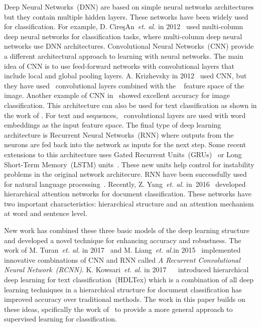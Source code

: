 \documentclass[sigconf, final]{acmart}
\begin{document}
Deep Neural Networks~(DNN) are based on simple neural networks architectures but they contain multiple hidden layers. These networks have been widely used for classification. For example, D. Cire{\c{s}}An~\textit{et. al.} in 2012~\cite{ci2012multitraffic} used multi-column deep neural networks for classification tasks, where  multi-column deep neural networks use DNN architectures. Convolutional Neural Networks~(CNN) provide a different architectural approach to learning with neural networks. The main idea of CNN is to use feed-forward networks with convolutional layers that include local and global pooling layers. A. Krizhevsky in 2012~\cite{krizhevsky2012imagenet} used CNN, but they have used~ convolutional layers combined with the ~ feature space of the image. Another example of CNN in~\cite{lecun2015deep} showed excellent accuracy for image classification.  This architecture can also be used for text classification as shown in the work of \cite{kim2014convolutional}. For text and sequences,~ convolutional layers are used with word embeddings as the input feature space. The final type of deep learning architecture is Recurrent Neural Networks~(RNN) where outputs from the neurons are fed back into the network as inputs for the next step. Some recent extensions to this architecture uses Gated Recurrent Units~(GRUs)~\cite{chung2014empirical} or Long Short-Term Memory~(LSTM) units~\cite{hochreiter1997long}. These new units help control for instability problems in the original network architecure. RNN have been successfully used for natural language processing~\cite{mikolov2010recurrent}. Recently, Z. Yang~\textit{et. al.} in~2016~\cite{yang2016hierarchical} developed hierarchical attention networks for document classification. These networks have two important characteristics: hierarchical structure and an attention mechanism at word and sentence level. 

New work has combined these three basic models of the deep learning structure and developed a novel technique for enhancing accuracy and robustness. The work of M. Turan~\textit{et. al.} in 2017~\cite{turan2017deep} and M. Liang~\textit{et. al.}in 2015~\cite{liang2015recurrent} implemented innovative combinations of CNN and RNN called \textit{A Recurrent Convolutional Neural Network~(RCNN)}. K. Kowsari~\textit{et. al.} in 2017~ ~\cite{kowsari2017HDLTex} introduced hierarchical deep learning for text classification~(HDLTex) which is a combination of all deep learning techniques in a hierarchical structure for document classification has improved accuracy over traditional methods. The work in this paper builds on these ideas, spcifically the work of~\cite{kowsari2017HDLTex} to provide a more general approach to supervised learning for classification.
\end{document}
